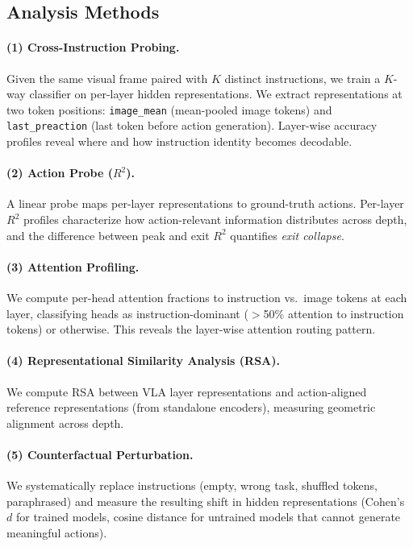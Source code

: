 \documentclass[letterpaper]{article}
\begin{document}
\subsection{Analysis Methods}
\label{sec:methods-probes}

\paragraph{(1) Cross-Instruction Probing.}
Given the same visual frame paired with $K$ distinct instructions, we train a $K$-way classifier on per-layer hidden representations.
We extract representations at two token positions: \texttt{image\_mean} (mean-pooled image tokens) and \texttt{last\_preaction} (last token before action generation).
Layer-wise accuracy profiles reveal where and how instruction identity becomes decodable.

\paragraph{(2) Action Probe ($R^2$).}
A linear probe maps per-layer representations to ground-truth actions.
Per-layer $R^2$ profiles characterize how action-relevant information distributes across depth, and the difference between peak and exit $R^2$ quantifies \emph{exit collapse}.

\paragraph{(3) Attention Profiling.}
We compute per-head attention fractions to instruction vs.\ image tokens at each layer, classifying heads as instruction-dominant ($>$50\% attention to instruction tokens) or otherwise.
This reveals the layer-wise attention routing pattern.

\paragraph{(4) Representational Similarity Analysis (RSA).}
We compute RSA between VLA layer representations and action-aligned reference representations (from standalone encoders), measuring geometric alignment across depth.

\paragraph{(5) Counterfactual Perturbation.}
We systematically replace instructions (empty, wrong task, shuffled tokens, paraphrased) and measure the resulting shift in hidden representations (Cohen's $d$ for trained models, cosine distance for untrained models that cannot generate meaningful actions).
\end{document}
